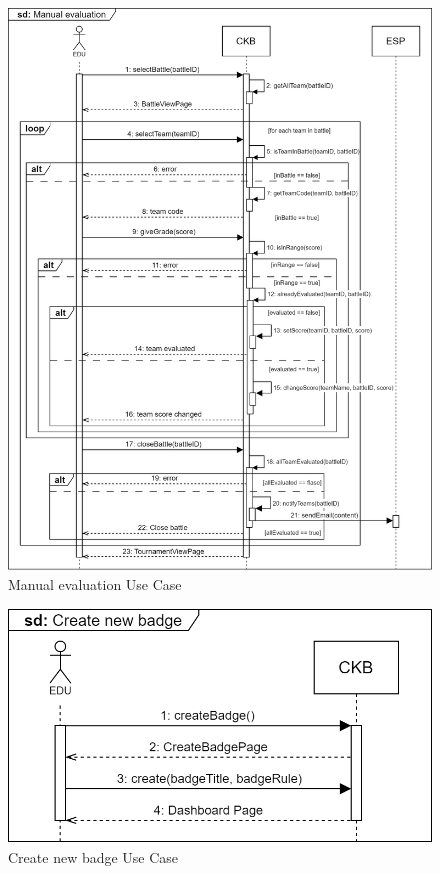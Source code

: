 \begin{figure}[H]
    \centering
    \includegraphics[width=1\textwidth]{images/sequence_diagrams/.png/Manual_Evaluation - UC9.png}
    \caption{Manual evaluation Use Case}
    \label{fig:uc9}
\end{figure}
\begin{figure}[H]
    \centering
    \includegraphics[width=1\textwidth]{images/sequence_diagrams/.png/Create_New_Badge - UC10.png}
    \caption{Create new badge Use Case}
    \label{fig:uc10}
\end{figure}
